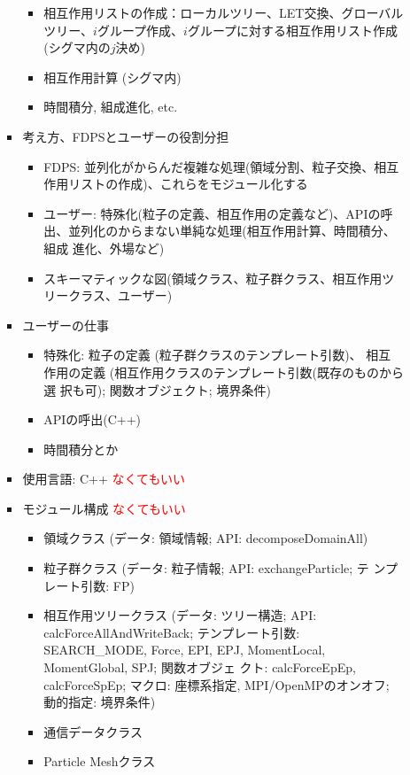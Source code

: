 \documentclass[12pt,a4paper]{jarticle}
\newcommand{\redtext}[1]{\textcolor{red}{#1}}
\begin{document}
\begin{itemize}
\begin{itemize}
\begin{itemize}
\begin{itemize}
      \item 相互作用リストの作成：ローカルツリー、LET交換、グローバル
        ツリー、$i$グループ作成、$i$グループに対する相互作用リスト作成
        (シグマ内の$j$決め)
      \item 相互作用計算 (シグマ内)
      \item 時間積分, 組成進化, etc.
      \end{itemize}
    \item 考え方、FDPSとユーザーの役割分担
      \begin{itemize}
      \item FDPS: 並列化がからんだ複雑な処理(領域分割、粒子交換、相互
        作用リストの作成)、これらをモジュール化する
      \item ユーザー: 特殊化(粒子の定義、相互作用の定義など)、APIの呼
        出、並列化のからまない単純な処理(相互作用計算、時間積分、組成
        進化、外場など)
      \item スキーマティックな図(領域クラス、粒子群クラス、相互作用ツ
        リークラス、ユーザー)
      \end{itemize}
    \item ユーザーの仕事
      \begin{itemize}
      \item 特殊化: 粒子の定義 (粒子群クラスのテンプレート引数)、 相互
        作用の定義 (相互作用クラスのテンプレート引数(既存のものから選
        択も可); 関数オブジェクト; 境界条件)
      \item APIの呼出(C++)
      \item 時間積分とか
      \end{itemize}
    \item 使用言語: C++ \redtext{なくてもいい}
    \item モジュール構成 \redtext{なくてもいい}
      \begin{itemize}
      \item 領域クラス (データ: 領域情報; API: decomposeDomainAll)
      \item 粒子群クラス (データ: 粒子情報; API: exchangeParticle; テ
        ンプレート引数: FP)
      \item 相互作用ツリークラス (データ: ツリー構造; API:
        calcForceAllAndWriteBack; テンプレート引数: SEARCH\_MODE,
        Force, EPI, EPJ, MomentLocal, MomentGlobal, SPJ; 関数オブジェ
        クト: calcForceEpEp, calcForceSpEp; マクロ: 座標系指定,
        MPI/OpenMPのオンオフ; 動的指定: 境界条件)
      \item 通信データクラス
      \item Particle Meshクラス

\end{itemize}
\end{itemize}
\end{itemize}
\end{itemize}
\end{document}
